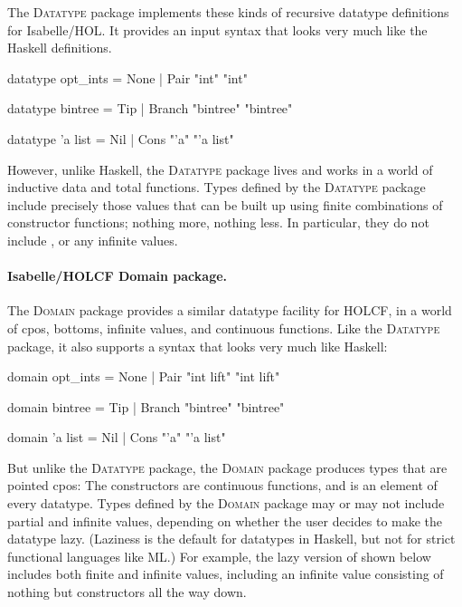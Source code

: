The \textsc{Datatype} package implements these kinds of recursive datatype definitions for Isabelle/HOL. It provides an input syntax that looks very much like the Haskell definitions.
%
\begin{isacode}
datatype opt_ints = None | Pair "int" "int"
\end{isacode}
\unmedskip
\begin{isacode}
datatype bintree = Tip | Branch "bintree" "bintree"
\end{isacode}
\unmedskip
\begin{isacode}
datatype 'a list = Nil | Cons "'a" "'a list"
\end{isacode}
%
However, unlike Haskell, the \textsc{Datatype} package lives and works in a world of inductive data and total functions. Types defined by the \textsc{Datatype} package include precisely those values that can be built up using finite combinations of constructor functions; nothing more, nothing less. In particular, they do not include , or any infinite values.

\paragraph{Isabelle/HOLCF Domain package.}

The \textsc{Domain} package provides a similar datatype facility for HOLCF, in a world of cpos, bottoms, infinite values, and continuous functions. Like the \textsc{Datatype} package, it also supports a syntax that looks very much like Haskell:
%
\begin{isacode}
domain opt_ints = None | Pair "int lift" "int lift"
\end{isacode}
\unmedskip
\begin{isacode}
domain bintree = Tip | Branch "bintree" "bintree"
\end{isacode}
\unmedskip
\begin{isacode}
domain 'a list = Nil | Cons "'a" "'a list"
\end{isacode}
%
But unlike the \textsc{Datatype} package, the \textsc{Domain} package produces types that are pointed cpos: The constructors are continuous functions, and  is an element of every datatype. Types defined by the \textsc{Domain} package may or may not include partial and infinite values, depending on whether the user decides to make the datatype lazy. (Laziness is the default for datatypes in Haskell, but not for strict functional languages like ML.) For example, the lazy version of  shown below includes both finite and infinite values, including an infinite value consisting of nothing but  constructors all the way down.

